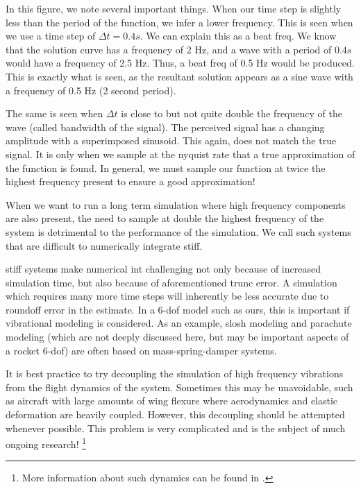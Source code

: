 \documentclass[10pt, openany, titlepage]{book}
\theoremstyle{definition}
\newcounter{example}[chapter]
\begin{document}
In this figure, we note several important things. When our time step is slightly less than the period of the function, we infer a lower frequency. This is seen when we use a time step of $\Delta t=0.4s$. We can explain this as a \gls{beat freq}. We know that the solution curve has a frequency of 2 Hz, and a wave with a period of $0.4 s$ would have a frequency of 2.5 Hz. Thus, a \gls{beat freq} of 0.5 Hz would be produced. This is exactly what is seen, as the resultant solution appears as a sine wave with a frequency of 0.5 Hz (2 second period). 


The same is seen when $\Delta t$ is close to but not quite double the frequency of the wave (called \gls{bandwidth} of the signal). The perceived signal has a changing amplitude with a superimposed sinusoid. This again, does not match the true signal. It is only when we sample at the \gls{nyquist rate} that a true approximation of the function is found. In general, we must sample our function at twice the highest frequency present to ensure a good approximation!

When we want to run a long term simulation where high frequency components are also present, the need to sample at double the highest frequency of the system is detrimental to the performance of the simulation. We call such systems that are difficult to numerically integrate \gls{stiff}.

\Gls{stiff} systems make \gls{numerical int} challenging not only because of increased simulation time, but also because of aforementioned \gls{trunc error}. A simulation which requires many more time steps will inherently be less accurate due to roundoff error in the estimate. In a 6-\gls{dof} model such as ours, this is important if vibrational modeling is considered. As an example, slosh modeling and parachute modeling (which are not deeply discussed here, but may be important aspects of a rocket 6-\gls{dof}) are often based on mass-spring-damper systems.

It is best practice to try decoupling the simulation of high frequency vibrations from the flight dynamics of the system. Sometimes this may be unavoidable, such as aircraft with large amounts of wing flexure where aerodynamics and elastic deformation are heavily coupled. However, this decoupling should be attempted whenever possible. This problem is very complicated and is the subject of much ongoing research! \footnote{More information about such dynamics can be found in \cite{shyy_recent_2010}.}
\end{document}
